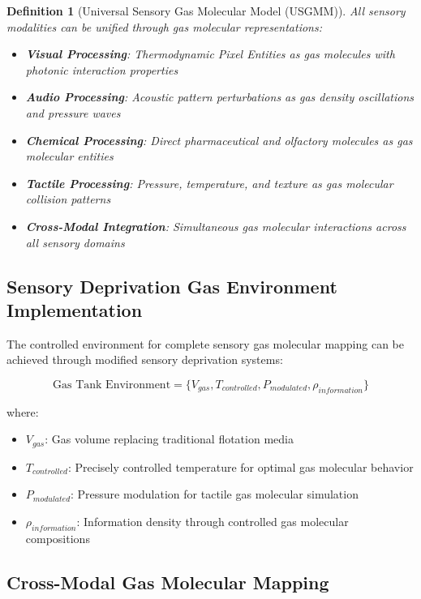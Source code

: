 \documentclass[11pt,a4paper]{article}
\newtheorem{definition}[theorem]{Definition}
\begin{document}
\begin{definition}[Universal Sensory Gas Molecular Model (USGMM)]
All sensory modalities can be unified through gas molecular representations:
\begin{itemize}
\item \textbf{Visual Processing}: Thermodynamic Pixel Entities as gas molecules with photonic interaction properties
\item \textbf{Audio Processing}: Acoustic pattern perturbations as gas density oscillations and pressure waves
\item \textbf{Chemical Processing}: Direct pharmaceutical and olfactory molecules as gas molecular entities
\item \textbf{Tactile Processing}: Pressure, temperature, and texture as gas molecular collision patterns
\item \textbf{Cross-Modal Integration}: Simultaneous gas molecular interactions across all sensory domains
\end{itemize}
\end{definition}

\subsection{Sensory Deprivation Gas Environment Implementation}

The controlled environment for complete sensory gas molecular mapping can be achieved through modified sensory deprivation systems:

\begin{equation}
\text{Gas Tank Environment} = \{V_{gas}, T_{controlled}, P_{modulated}, \rho_{information}\}
\end{equation}

where:
\begin{itemize}
\item $V_{gas}$: Gas volume replacing traditional flotation media
\item $T_{controlled}$: Precisely controlled temperature for optimal gas molecular behavior
\item $P_{modulated}$: Pressure modulation for tactile gas molecular simulation
\item $\rho_{information}$: Information density through controlled gas molecular compositions
\end{itemize}

\subsection{Cross-Modal Gas Molecular Mapping}
\end{document}
